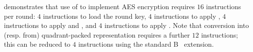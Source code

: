 demonstrates that use of 
to implement AES encryption requires
$16$ instructions per round:
$ 4$ 
     instructions to load the round key,
$ 4$ 
     instructions to apply ,
$ 4$ 
     instructions to apply  and ,
     and
$ 4$ 
     instructions to apply .
Note that conversion into (resp. from) quadrant-packed representation
requires a further
$12$ instructions;
     this can be reduced to
$ 4$ 
     instructions using the 
     standard 
     B~\cite[Section 17]{RV:ISA:I:19}
     extension.


